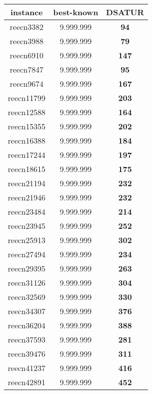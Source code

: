 \begin{tabular}{cc||c}
instance & best-known & DSATUR \\ 
 \hline 
reecn3382        & 9.999.999        & {\bf 94}        \\ 
reecn3988        & 9.999.999        & {\bf 79}        \\ 
reecn6910        & 9.999.999        & {\bf 147}       \\ 
reecn7847        & 9.999.999        & {\bf 95}        \\ 
reecn9674        & 9.999.999        & {\bf 167}       \\ 
reecn11799       & 9.999.999        & {\bf 203}       \\ 
reecn12588       & 9.999.999        & {\bf 164}       \\ 
reecn15355       & 9.999.999        & {\bf 202}       \\ 
reecn16388       & 9.999.999        & {\bf 184}       \\ 
reecn17244       & 9.999.999        & {\bf 197}       \\ 
reecn18615       & 9.999.999        & {\bf 175}       \\ 
reecn21194       & 9.999.999        & {\bf 232}       \\ 
reecn21946       & 9.999.999        & {\bf 232}       \\ 
reecn23484       & 9.999.999        & {\bf 214}       \\ 
reecn23945       & 9.999.999        & {\bf 252}       \\ 
reecn25913       & 9.999.999        & {\bf 302}       \\ 
reecn27494       & 9.999.999        & {\bf 234}       \\ 
reecn29395       & 9.999.999        & {\bf 263}       \\ 
reecn31126       & 9.999.999        & {\bf 304}       \\ 
reecn32569       & 9.999.999        & {\bf 330}       \\ 
reecn34307       & 9.999.999        & {\bf 376}       \\ 
reecn36204       & 9.999.999        & {\bf 388}       \\ 
reecn37593       & 9.999.999        & {\bf 281}       \\ 
reecn39476       & 9.999.999        & {\bf 311}       \\ 
reecn41237       & 9.999.999        & {\bf 416}       \\ 
reecn42891       & 9.999.999        & {\bf 452}       \\ 

\end{tabular}
